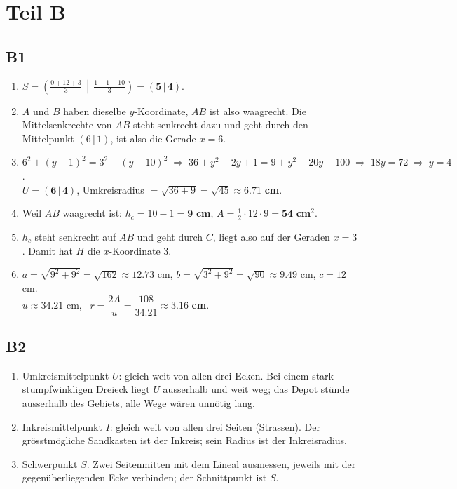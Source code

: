 \documentclass[11pt,a4paper]{article}
\begin{document}
\section{Teil B}

\subsection{B1}
\begin{enumerate}
\item $S = \left(\frac{0+12+3}{3}\,\middle|\,\frac{1+1+10}{3}\right) = \mathbf{(5\,|\,4)}$.
\item $A$ und $B$ haben dieselbe $y$-Koordinate, $AB$ ist also waagrecht. Die Mittelsenkrechte von $AB$ steht senkrecht dazu und geht durch den Mittelpunkt $(6\,|\,1)$, ist also die Gerade $x = 6$.
\item $6^2 + (y-1)^2 = 3^2 + (y-10)^2 \;\Rightarrow\; 36 + y^2 - 2y + 1 = 9 + y^2 - 20y + 100 \;\Rightarrow\; 18y = 72 \;\Rightarrow\; y = 4$.\\
$U = \mathbf{(6\,|\,4)}$, Umkreisradius $= \sqrt{36+9} = \sqrt{45} \approx \mathbf{6.71}$ \textbf{cm}.
\item Weil $AB$ waagrecht ist: $h_c = 10 - 1 = \mathbf{9}$ \textbf{cm}, $A = \tfrac12 \cdot 12 \cdot 9 = \mathbf{54}$ \textbf{cm}$^2$.
\item $h_c$ steht senkrecht auf $AB$ und geht durch $C$, liegt also auf der Geraden $x = 3$. Damit hat $H$ die $x$-Koordinate 3.
\item $a = \sqrt{9^2+9^2} = \sqrt{162} \approx 12.73$ cm, $b = \sqrt{3^2+9^2} = \sqrt{90} \approx 9.49$ cm, $c = 12$ cm.\\
$u \approx 34.21$ cm, \ $r = \dfrac{2A}{u} = \dfrac{108}{34.21} \approx \mathbf{3.16}$ \textbf{cm}.
\end{enumerate}

\subsection{B2}
\begin{enumerate}
\item Umkreismittelpunkt $U$: gleich weit von allen drei Ecken. Bei einem stark stumpfwinkligen Dreieck liegt $U$ ausserhalb und weit weg; das Depot st\"unde ausserhalb des Gebiets, alle Wege w\"aren unn\"otig lang.
\item Inkreismittelpunkt $I$: gleich weit von allen drei Seiten (Strassen). Der gr\"osstm\"ogliche Sandkasten ist der Inkreis; sein Radius ist der Inkreisradius.
\item Schwerpunkt $S$. Zwei Seitenmitten mit dem Lineal ausmessen, jeweils mit der gegen\"uberliegenden Ecke verbinden; der Schnittpunkt ist $S$.
\end{enumerate}
\end{document}
